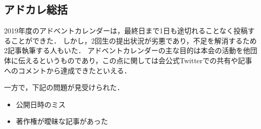\subsection*{アドカレ総括}


2019年度のアドベントカレンダーは，最終日まで1日も途切れることなく投稿することができた．
しかし，2回生の提出状況が劣悪であり，不足を解消するため2記事執筆する人もいた．
アドベントカレンダーの主な目的は本会の活動を他団体に伝えるというものであり，この点に関しては会公式Twitterでの共有や記事へのコメントから達成できたといえる．

一方で，下記の問題が見受けられた．
\begin{itemize}
\item 公開日時のミス
\item 著作権が曖昧な記事があった
\end{itemize}

